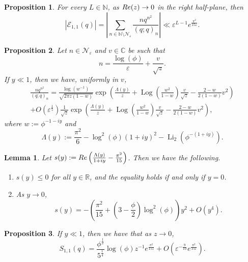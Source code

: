 \documentclass[10pt,a4paper]{amsart}
\newtheorem{proposition}{Proposition}
\newtheorem{lemma}{Lemma}
\def\Li{\operatorname{Li}}
\def\Log{\operatorname{Log}}
\renewcommand{\Re}{{\rm Re}}
\begin{document}
\begin{proposition}\label{prop:far}
	For every $L \in \mathbb{N}$, as $\Re(z) \to 0$ in the right half-plane, then
	\[
		\left| \mathcal{E}_{1,1}(q) \right| = \left|\sum_{n \in \mathbb{N} \setminus \mathcal{N}_{\varepsilon}}  \frac{nq^{n^2}}{(q;q)_n} \right| \ll \varepsilon^{L-1} e^{\frac{\pi^2}{15\varepsilon}}.
	\]
\end{proposition}

\begin{proposition}\label{prop:wider}
	Let $n \in \mathcal{N}_{\varepsilon}$ and $v \in \mathbb{C}$ be such that
	\[
		n = \frac{\log(\phi)}{\varepsilon} + \frac{v}{\sqrt{z}}. 
	\]
	If $y \ll 1$, then we have, uniformly in $v$,
	\begin{multline*}
		\frac{n q^{n^2}}{(q;q)_n} = \frac{\log(w^{-1})}{\sqrt{2\pi z(1-w)}} \exp\left(\frac{\Lambda (y)}{z} + \Log\left(\frac{w^2}{1-w}\right)\frac{v}{\sqrt{z}} - \frac{2-w}{2(1-w)}  v^2   \right) \\
		+ O\left(\varepsilon^{\frac{1}{5}}\right) \frac{1}{\sqrt{z}} \exp\left(\frac{\Lambda (y)}{z} + \Log\left(\frac{w^2}{1-w}\right)\frac{v}{\sqrt{z}} - \frac{2-w}{2(1-w)}  v^2   \right),
	\end{multline*}
	where $w := \phi^{-1-iy}$ and
	\begin{equation}\label{eq:Lamma}
		\Lambda(y) := \frac{\pi^2}{6} - \log^2(\phi) (1+iy)^2 - \Li_2 ( \phi^{-(1+iy)} ).
	\end{equation}
\end{proposition}

\begin{lemma}\label{lem:s}
	Let $s(y):=\Re\left(\frac{\Lambda(y)}{1+iy} - \frac{\pi^2}{15}\right)$. Then we have the following.
	\begin{enumerate}
		\item $s(y) \leq 0$ for all $y \in \mathbb{R}$, and the equality holds if and only if $y=0$.
		\item As $y \to 0$,
		\[
			s(y) = - \left(\frac{\pi^2}{15} + \left( 3- \frac{\phi}{2}\right)\log^2(\phi) \right)y^2 + O\left(y^4\right).
		\]
	\end{enumerate}
\end{lemma}

\begin{proposition}\label{prop:S11_asymp}
	If $y \ll 1$, then we have that as $z \to 0$,
	\[
		S_{1,1}(q) = \frac{\phi^{\frac12} }{5^{\frac14}}\log(\phi)  z^{-1} e^{\frac{\pi^2}{15 z}} +  O\left(\varepsilon^{-\frac{9}{10}} e^{\frac{\pi^2}{15\varepsilon}}\right).
	\]
\end{proposition}
\end{document}
